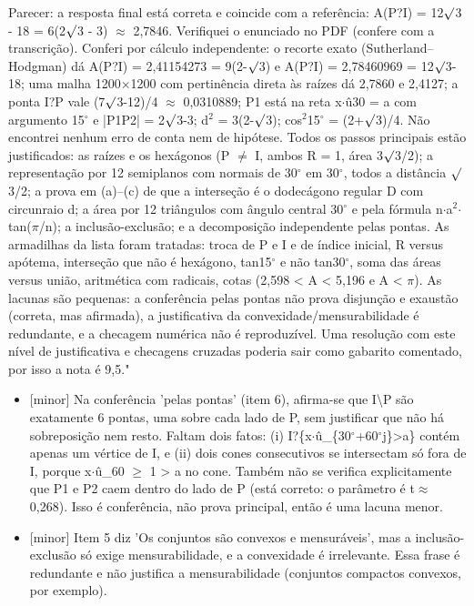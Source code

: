 \documentclass{article}%
\begin{document}
Parecer: a resposta final está correta e coincide com a referência: A(P?I) = 12$\surd$3 - 18 = 6(2$\surd$3 - 3) $\approx$ 2,7846. Verifiquei o enunciado no PDF (confere com a transcrição). Conferi por cálculo independente: o recorte exato (Sutherland--Hodgman) dá A(P?I) = 2,41154273 = 9(2-$\surd$3) e A(P?I) = 2,78460969 = 12$\surd$3-18; uma malha 1200$\times$1200 com pertinência direta às raízes dá 2,7860 e 2,4127; a ponta I?P vale (7$\surd$3-12)/4 $\approx$ 0,0310889; P1 está na reta x$\cdot$û30 = a com argumento 15$^\circ$ e |P1P2| = 2$\surd$3-3; d$^2$ = 3(2-$\surd$3); cos$^2$15$^\circ$ = (2+$\surd$3)/4. Não encontrei nenhum erro de conta nem de hipótese. Todos os passos principais estão justificados: as raízes e os hexágonos (P $\neq$ I, ambos R = 1, área 3$\surd$3/2); a representação por 12 semiplanos com normais de 30$^\circ$ em 30$^\circ$, todos a distância $\surd$3/2; a prova em (a)--(c) de que a interseção é o dodecágono regular D com circunraio d; a área por 12 triângulos com ângulo central 30$^\circ$ e pela fórmula n$\cdot$a$^2$$\cdot$tan($\pi$/n); a inclusão{-}exclusão; e a decomposição independente pelas pontas. As armadilhas da lista foram tratadas: troca de P e I e de índice inicial, R versus apótema, interseção que não é hexágono, tan15$^\circ$ e não tan30$^\circ$, soma das áreas versus união, aritmética com radicais, cotas (2,598 < A < 5,196 e A < $\pi$). As lacunas são pequenas: a conferência pelas pontas não prova disjunção e exaustão (correta, mas afirmada), a justificativa da convexidade/mensurabilidade é redundante, e a checagem numérica não é reproduzível. Uma resolução com este nível de justificativa e checagens cruzadas poderia sair como gabarito comentado, por isso a nota é 9,5."%
\begin{itemize}%
\item%
{[}minor{]} Na conferência 'pelas pontas' (item 6), afirma{-}se que I\textbackslash{}P são exatamente 6 pontas, uma sobre cada lado de P, sem justificar que não há sobreposição nem resto. Faltam dois fatos: (i) I?\{x$\cdot$û\_\{30$^\circ$+60$^\circ$j\}>a\} contém apenas um vértice de I, e (ii) dois cones consecutivos se intersectam só fora de I, porque x$\cdot$û\_60 $\geq$ 1 > a no cone. Também não se verifica explicitamente que P1 e P2 caem dentro do lado de P (está correto: o parâmetro é t$\approx$0,268). Isso é conferência, não prova principal, então é uma lacuna menor.%
\item%
{[}minor{]} Item 5 diz 'Os conjuntos são convexos e mensuráveis', mas a inclusão{-}exclusão só exige mensurabilidade, e a convexidade é irrelevante. Essa frase é redundante e não justifica a mensurabilidade (conjuntos compactos convexos, por exemplo).%

\end{itemize}$$
\end{document}
